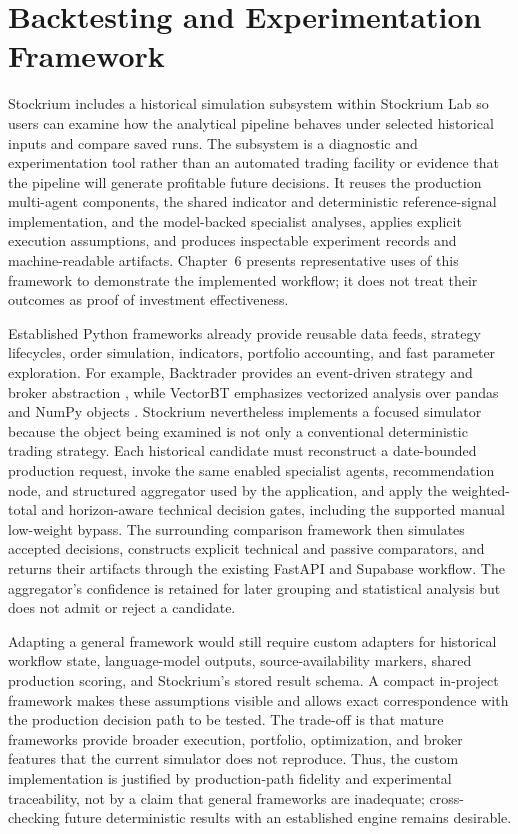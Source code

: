 \section{Backtesting and Experimentation Framework}
\label{sec:backtesting-framework}

Stockrium includes a historical simulation subsystem within Stockrium Lab so users can examine how the analytical pipeline behaves under selected historical inputs and compare saved runs. The subsystem is a diagnostic and experimentation tool rather than an automated trading facility or evidence that the pipeline will generate profitable future decisions. It reuses the production multi-agent components, the shared indicator and deterministic reference-signal implementation, and the model-backed specialist analyses, applies explicit execution assumptions, and produces inspectable experiment records and machine-readable artifacts. Chapter~6 presents representative uses of this framework to demonstrate the implemented workflow; it does not treat their outcomes as proof of investment effectiveness.

Established Python frameworks already provide reusable data feeds, strategy lifecycles, order simulation, indicators, portfolio accounting, and fast parameter exploration. For example, Backtrader provides an event-driven strategy and broker abstraction \cite{backtraderDocs2026}, while VectorBT emphasizes vectorized analysis over pandas and NumPy objects \cite{vectorbtDocs2026}. Stockrium nevertheless implements a focused simulator because the object being examined is not only a conventional deterministic trading strategy. Each historical candidate must reconstruct a date-bounded production request, invoke the same enabled specialist agents, recommendation node, and structured aggregator used by the application, and apply the weighted-total and horizon-aware technical decision gates, including the supported manual low-weight bypass. The surrounding comparison framework then simulates accepted decisions, constructs explicit technical and passive comparators, and returns their artifacts through the existing FastAPI and Supabase workflow. The aggregator's confidence is retained for later grouping and statistical analysis but does not admit or reject a candidate.

Adapting a general framework would still require custom adapters for historical workflow state, language-model outputs, source-availability markers, shared production scoring, and Stockrium's stored result schema. A compact in-project framework makes these assumptions visible and allows exact correspondence with the production decision path to be tested. The trade-off is that mature frameworks provide broader execution, portfolio, optimization, and broker features that the current simulator does not reproduce. Thus, the custom implementation is justified by production-path fidelity and experimental traceability, not by a claim that general frameworks are inadequate; cross-checking future deterministic results with an established engine remains desirable.

